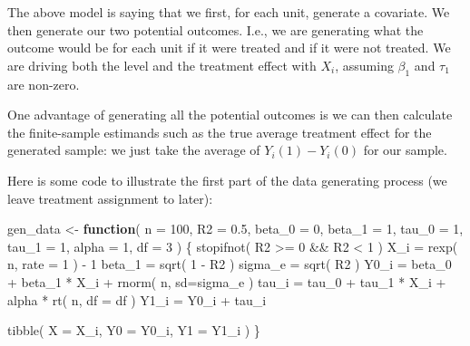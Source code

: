\documentclass[
]{book}
\newenvironment{Shaded}{\begin{snugshade}}{\end{snugshade}}
\newcommand{\AttributeTok}[1]{\textcolor[rgb]{0.77,0.63,0.00}{#1}}
\newcommand{\ControlFlowTok}[1]{\textcolor[rgb]{0.13,0.29,0.53}{\textbf{#1}}}
\newcommand{\DecValTok}[1]{\textcolor[rgb]{0.00,0.00,0.81}{#1}}
\newcommand{\FloatTok}[1]{\textcolor[rgb]{0.00,0.00,0.81}{#1}}
\newcommand{\FunctionTok}[1]{\textcolor[rgb]{0.00,0.00,0.00}{#1}}
\newcommand{\NormalTok}[1]{#1}
\newcommand{\OtherTok}[1]{\textcolor[rgb]{0.56,0.35,0.01}{#1}}
\newcommand{\SpecialCharTok}[1]{\textcolor[rgb]{0.00,0.00,0.00}{#1}}
\begin{document}
The above model is saying that we first, for each unit, generate a covariate.
We then generate our two potential outcomes.
I.e., we are generating what the outcome would be for each unit if it were treated and if it were not treated.
We are driving both the level and the treatment effect with \(X_i\), assuming \(\beta_1\) and \(\tau_1\) are non-zero.

One advantage of generating all the potential outcomes is we can then calculate the finite-sample estimands such as the true average treatment effect for the generated sample: we just take the average of \(Y_i(1) - Y_i(0)\) for our sample.

Here is some code to illustrate the first part of the data generating process (we leave treatment assignment to later):

\begin{Shaded}
\begin{Highlighting}[]
\NormalTok{gen\_data }\OtherTok{\textless{}{-}} \ControlFlowTok{function}\NormalTok{( }\AttributeTok{n =} \DecValTok{100}\NormalTok{,}
                      \AttributeTok{R2 =} \FloatTok{0.5}\NormalTok{,}
                      \AttributeTok{beta\_0 =} \DecValTok{0}\NormalTok{, }\AttributeTok{beta\_1 =} \DecValTok{1}\NormalTok{,}
                      \AttributeTok{tau\_0 =} \DecValTok{1}\NormalTok{, }\AttributeTok{tau\_1 =} \DecValTok{1}\NormalTok{, }
                      \AttributeTok{alpha =} \DecValTok{1}\NormalTok{, }\AttributeTok{df =} \DecValTok{3}\NormalTok{ ) \{}
  \FunctionTok{stopifnot}\NormalTok{( R2 }\SpecialCharTok{\textgreater{}=} \DecValTok{0} \SpecialCharTok{\&\&}\NormalTok{ R2 }\SpecialCharTok{\textless{}} \DecValTok{1}\NormalTok{ )}
\NormalTok{  X\_i }\OtherTok{=} \FunctionTok{rexp}\NormalTok{( n, }\AttributeTok{rate =} \DecValTok{1}\NormalTok{ ) }\SpecialCharTok{{-}} \DecValTok{1}
\NormalTok{  beta\_1 }\OtherTok{=} \FunctionTok{sqrt}\NormalTok{( }\DecValTok{1} \SpecialCharTok{{-}}\NormalTok{ R2 )}
\NormalTok{  sigma\_e }\OtherTok{=} \FunctionTok{sqrt}\NormalTok{( R2 )}
\NormalTok{  Y0\_i }\OtherTok{=}\NormalTok{ beta\_0 }\SpecialCharTok{+}\NormalTok{ beta\_1 }\SpecialCharTok{*}\NormalTok{ X\_i }\SpecialCharTok{+} \FunctionTok{rnorm}\NormalTok{( n, }\AttributeTok{sd=}\NormalTok{sigma\_e )}
\NormalTok{  tau\_i }\OtherTok{=}\NormalTok{ tau\_0 }\SpecialCharTok{+}\NormalTok{ tau\_1 }\SpecialCharTok{*}\NormalTok{ X\_i }\SpecialCharTok{+}\NormalTok{ alpha }\SpecialCharTok{*} \FunctionTok{rt}\NormalTok{( n, }\AttributeTok{df =}\NormalTok{ df )}
\NormalTok{  Y1\_i }\OtherTok{=}\NormalTok{ Y0\_i }\SpecialCharTok{+}\NormalTok{ tau\_i}
  
  \FunctionTok{tibble}\NormalTok{( }\AttributeTok{X =}\NormalTok{ X\_i, }\AttributeTok{Y0 =}\NormalTok{ Y0\_i, }\AttributeTok{Y1 =}\NormalTok{ Y1\_i )}
\NormalTok{\}}
\end{Highlighting}
\end{Shaded}
\end{document}
